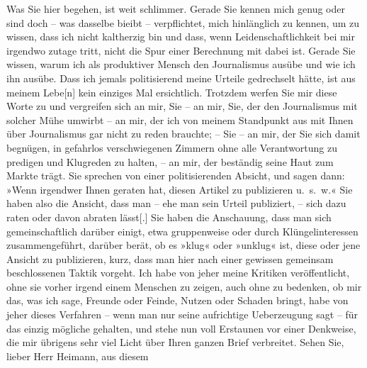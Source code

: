 \begin{ledgroupsized}[t]{13cm}
               Was Sie hier begehen, ist weit schlimmer. Gerade Sie kennen mich genug oder sind doch
               – was dasselbe bieibt – verpflichtet, mich hinlänglich zu kennen, um zu wissen, dass
               ich nicht kaltherzig bin und dass, wenn Leidenschaftlichkeit bei mir irgendwo zutage
               tritt, nicht die Spur einer Berechnung mit dabei ist. Gerade Sie wissen, warum ich
               als produktiver Mensch den Journalismus ausübe und wie ich ihn ausübe. Dass ich
               jemals politisierend meine Urteile gedrechselt hätte, ist aus meinem
                  Lebe{[}n{]} kein einziges Mal ersichtlich. Trotzdem werfen Sie mir
               diese Worte zu und vergreifen sich an mir, Sie – an mir, Sie, der den Journalismus
               mit solcher Mühe umwirbt – an mir, der ich von meinem Standpunkt aus mit Ihnen über
               Journalismus gar nicht zu reden brauchte; – Sie – an mir, der Sie sich damit
               begnügen, in gefahrlos verschwiegenen Zimmern ohne alle Verantwortung zu pre{\pb}digen und Klugreden zu halten, –
               an mir, der beständig seine Haut zum Markte trägt.\pend
           \pstart
           Sie sprechen von einer politisierenden Absicht, und sagen dann: »Wenn irgendwer Ihnen
               geraten hat, diesen Artikel zu publizieren u. s. w.« Sie haben also die
               Ansicht, dass man – ehe man sein Urteil publiziert, – sich dazu raten oder davon
               abraten lässt{[}.{]} Sie haben die Anschauung, dass man sich
               gemeinschaftlich darüber einigt, etwa gruppenweise oder durch Klüngelinteressen
               zusammengeführt, darüber berät, ob es »klug« oder »unklug« ist, diese oder jene
               Ansicht zu publizieren, kurz, dass man hier nach einer gewissen gemeinsam
               beschlossenen Taktik vorgeht.\pend
           \pstart
           Ich habe von jeher meine Kritiken veröffentlicht, ohne sie vorher irgend einem
               Menschen zu zeigen, auch ohne zu bedenken, ob mir das, was ich sage, Freunde oder
               Feinde, Nutzen oder Schaden bringt, habe von jeher dieses Verfahren – wenn man nur
               seine aufrichtige Ueberzeugung sagt – für das einzig mögliche gehalten, und stehe nun
               voll Erstaunen vor einer Denkweise, die mir übrigens sehr viel Licht über Ihren
               ganzen Brief verbreitet.\pend
           \pstart
           Sehen Sie, lieber Herr Heimann, aus diesem

\end{ledgroupsized}

